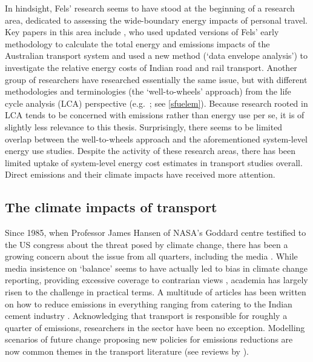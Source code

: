 In hindsight, Fels' research seems to have stood at the beginning of a
research area, dedicated to assessing the wide-boundary energy impacts of
personal travel. Key papers in this area include \citet{Lenzen1999}, who used
updated versions of Fels' early methodology to calculate the total energy and
emissions impacts of the Australian transport system and  \citet{Ramanathan2000}
used a new method (`data envelope analysis') to investigate
the relative energy costs of Indian road and rail transport.
Another group of researchers have researched essentially the same
issue, but with different methodologies and terminologies
(the `well-to-wheels' approach) from the
life cycle analysis (LCA) perspective (e.g.~\citealp{wang2002fuel};
see \cref{sfuelem}).
Because research rooted in LCA tends to be
concerned with emissions rather than energy use per se, it is
of slightly less relevance to this thesis.
Surprisingly, there seems to be
limited overlap between the well-to-wheels approach and the aforementioned
system-level energy use studies.
Despite the activity of these research areas, 
there has been limited uptake of system-level energy
cost estimates in transport studies overall. Direct emissions and
their climate impacts have received more attention.

\subsection{The climate impacts of transport}
Since 1985, when Professor James Hansen of NASA's Goddard centre testified
to the US congress about the threat posed by climate change, there has
been a growing concern about the issue from all quarters, including the media
\citep{Boykoff2007}. While media insistence on `balance' seems to have actually
led to bias in climate change reporting, providing excessive coverage to contrarian
views \citep{boykoff2004balance}, academia has largely risen to
the challenge in practical terms. A multitude of articles has been written on how to
reduce emissions in everything ranging from catering \citep{gossling2011food}
to the Indian cement industry \citep{kumar2010environmental}.
Acknowledging that transport is responsible for roughly a quarter of emissions,
researchers in the sector have been no exception.
Modelling scenarios of future change proposing new policies
for emissions reductions are now common themes in the transport literature
(see reviews by \citealp{Chapman2007} \citealp{ross2010analysis}).


